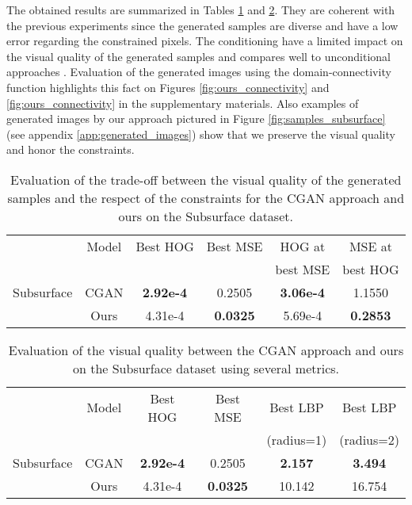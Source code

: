 The obtained results are summarized in Tables \ref{tab:subsurface} and \ref{tab:subsurface_visual}. They are coherent with the previous experiments since the generated samples are diverse and have a low error regarding the constrained pixels. The conditioning have a limited impact on the visual quality of the generated samples and compares well to unconditional approaches \cite{ruffino2018dilated}. Evaluation of the generated images using the domain-connectivity function highlights this fact on Figures \ref{fig:ours_connectivity} and \ref{fig:ours_connectivity} in the supplementary materials. Also examples of generated images by our approach  pictured in Figure \ref{fig:samples_subsurface} (see appendix \ref{app:generated_images}) show that we preserve the visual quality and honor the constraints.

\begin{table}
	\centering
	\begin{tabular}{|l|c|c|c|c|c|}
		\hline
		&Model           & Best HOG & Best MSE& HOG at & MSE at \\
		&&& &  best MSE & best HOG \\
		\hline
		Subsurface &CGAN   & \textbf{2.92e-4} & 0.2505 & \textbf{3.06e-4}  & 1.1550 \\
		&Ours            & 4.31e-4 & \textbf{0.0325}& 5.69e-4 & \textbf{0.2853} \\
		\hline
	\end{tabular}
	\caption{Evaluation of the trade-off between the visual quality of the generated samples and the respect of the constraints for the CGAN approach and ours on the Subsurface dataset.}
	\label{tab:subsurface}
\end{table}

\begin{table}[h]
	\centering
	\begin{tabular}{|l|c|c|c|c|c|}
		\hline
		&Model           & Best HOG & Best MSE& Best LBP & Best LBP \\
		&&& & (radius=1) & (radius=2) \\
		\hline
		Subsurface &CGAN   & \textbf{2.92e-4} & 0.2505 & \textbf{2.157} & \textbf{3.494}\\
		&Ours            &  4.31e-4 &\textbf{0.0325} & 10.142 & 16.754 \\
		\hline
	\end{tabular}
	\caption{Evaluation of the visual quality between the CGAN approach and ours on the Subsurface dataset using several metrics.}
	\label{tab:subsurface_visual}
\end{table}



